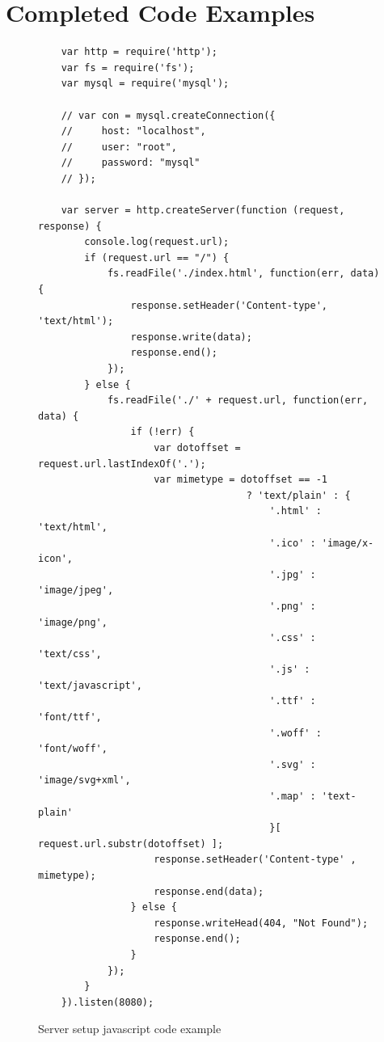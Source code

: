 \documentclass[12pt, a4paper]{article}
\begin{document}
        \section{Completed Code Examples}
            \footnotesize
            \begin{figure}[H]
                \begin{lstlisting}
    var http = require('http');
    var fs = require('fs');
    var mysql = require('mysql');

    // var con = mysql.createConnection({
    //     host: "localhost",
    //     user: "root",
    //     password: "mysql"
    // });

    var server = http.createServer(function (request, response) {
        console.log(request.url);
        if (request.url == "/") {
            fs.readFile('./index.html', function(err, data) {
                response.setHeader('Content-type', 'text/html');
                response.write(data);
                response.end();
            });
        } else {
            fs.readFile('./' + request.url, function(err, data) {
                if (!err) {
                    var dotoffset = request.url.lastIndexOf('.');
                    var mimetype = dotoffset == -1
                                    ? 'text/plain' : {
                                        '.html' : 'text/html',
                                        '.ico' : 'image/x-icon',
                                        '.jpg' : 'image/jpeg',
                                        '.png' : 'image/png',
                                        '.css' : 'text/css',
                                        '.js' : 'text/javascript',
                                        '.ttf' : 'font/ttf',
                                        '.woff' : 'font/woff',
                                        '.svg' : 'image/svg+xml',
                                        '.map' : 'text-plain'
                                        }[ request.url.substr(dotoffset) ];
                    response.setHeader('Content-type' , mimetype);
                    response.end(data);
                } else {
                    response.writeHead(404, "Not Found");
                    response.end();
                }
            });
        }
    }).listen(8080);
                \end{lstlisting}
                \caption{Server setup javascript code example}
            \end{figure}
            \normalsize
            \footnotesize
\end{document}

